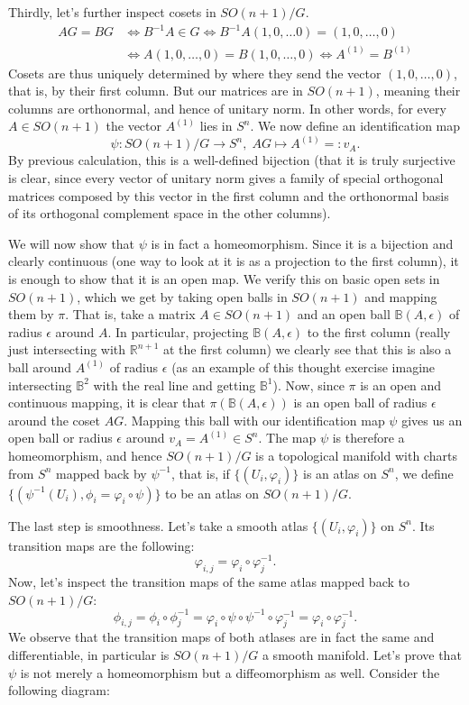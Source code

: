 \documentclass[a4paper, 12pt]{article} %
\newcommand{\R}{\mathbb{R}}
\begin{document}
\begin{enumerate}[label=(\alph*)]
Thirdly, let's further inspect cosets in $SO(n+1)/G$.
\begin{align*}
AG = BG &\iff B^{-1}A \in G \iff B^{-1}A (1, 0, \dots 0) = (1, 0, \dots, 0)\\
 &\iff A(1, 0, \dots, 0) = B(1, 0, \dots, 0) \iff A^{(1)} = B^{(1)}
\end{align*}
Cosets are thus uniquely determined by where they send the vector $(1, 0, \dots, 0)$, that is, by their first column. But our matrices are in $SO(n+1)$, meaning their columns are orthonormal, and hence of unitary norm. In other words, for every $A \in SO(n+1)$ the vector $A^{(1)}$ lies in $S^n$.
We now define an identification map
\[
\psi\colon SO(n+1)/G \to S^n, \; AG \mapsto A^{(1)} =: v_A.
\] By previous calculation, this is a well-defined bijection (that it is truly surjective is clear, since every vector of unitary norm gives a family of special orthogonal matrices composed by this vector in the first column and the orthonormal basis of its orthogonal complement space in the other columns).

We will now show that $\psi$ is in fact a homeomorphism. Since it is a bijection and clearly continuous (one way to look at it is as a projection to the first column), it is enough to show that it is an open map. We verify this on basic open sets in $SO(n+1)$, which we get by taking open balls in $SO(n+1)$ and mapping them by $\pi$. That is, take a matrix $A \in SO(n+1)$ and an open ball $\mathbb{B}(A, \epsilon)$ of radius $\epsilon$ around $A$. In particular, projecting $\mathbb{B}(A, \epsilon)$ to the first column (really just intersecting with $\R^{n+1}$ at the first column) we clearly see that this is also a ball around $A^{(1)}$ of radius $\epsilon$ (as an example of this thought exercise imagine intersecting $\mathbb{B}^2$ with the real line and getting $\mathbb{B}^1$). Now, since $\pi$ is an open and continuous mapping, it is clear that $\pi(\mathbb{B}(A, \epsilon))$ is an open ball of radius $\epsilon$ around the coset $AG$. Mapping this ball with our identification map $\psi$ gives us an open ball or radius $\epsilon$ around $v_A = A^{(1)} \in S^n$. The map $\psi$ is therefore a homeomorphism, and hence $SO(n+1)/G$ is a topological manifold with charts from $S^n$ mapped back by $\psi^{-1}$, that is, if $\lbrace (U_i, \varphi_i) \rbrace$ is an atlas on $S^n$, we define $\lbrace (\psi^{-1}(U_i), \phi_i = \varphi_i\circ\psi)\rbrace$ to be an atlas on $SO(n+1)/G$.

The last step is smoothness. Let's take a smooth atlas $\lbrace (U_i, \varphi_i) \rbrace$ on $S^n$. Its transition maps are the following:
\[
\varphi_{i,j} = \varphi_i\circ\varphi_j^{-1}.
\]
Now, let's inspect the transition maps of the same atlas mapped back to $SO(n+1)/G$:
\[
\phi_{i,j} = \phi_i\circ\phi_j^{-1} = \varphi_i\circ\psi\circ\psi^{-1}\circ\varphi_j^{-1} = \varphi_i\circ\varphi_j^{-1}.
\]
We observe that the transition maps of both atlases are in fact the same and differentiable, in particular is $SO(n+1)/G$ a smooth manifold. Let's prove that $\psi$ is not merely a homeomorphism but a diffeomorphism as well.
Consider the following diagram:


\end{enumerate}
\end{document}
